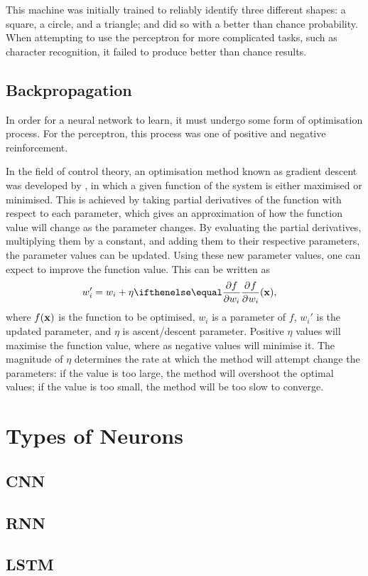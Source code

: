 This machine was initially trained to reliably identify three different shapes:
a square, a circle, and a triangle; and did so with a better than chance
probability.
When attempting to use the perceptron for more complicated tasks, such as
character recognition, it failed to produce better than chance results.


\subsection{Backpropagation}

In order for a neural network to learn, it must undergo some form of
optimisation process.
For the perceptron, this process was one of positive and negative reinforcement.

In the field of control theory, an optimisation method known as gradient descent
was developed by \cite{Kelley:1960:Gradient}, in which a given function of the
system is either maximised or minimised.
This is achieved by taking partial derivatives of the function with respect to
each parameter, which gives an approximation of how the function value will
change as the parameter changes.
By evaluating the partial derivatives, multiplying them by a constant, and
adding them to their respective parameters, the parameter values can be updated.
Using these new parameter values, one can expect to improve the function value.
This can be written as
\begin{align*}
    w_i' &= w_i + \eta\Rpdiff{f}{w_i}(\Rvec{x}),
\end{align*}
where $f(\mathbf{x})$ is the function to be optimised, $w_i$ is a parameter of
$f$, $w_i'$ is the updated parameter, and $\eta$ is ascent/descent parameter.
Positive $\eta$ values will maximise the function value, where as negative
values will minimise it.
The magnitude of $\eta$ determines the rate at which the method will attempt
change the parameters: if the value is too large, the method will overshoot the
optimal values; if the value is too small, the method will be too slow to
converge.


\section{Types of Neurons}


\subsection{CNN}
\subsection{RNN}
\subsection{LSTM}

